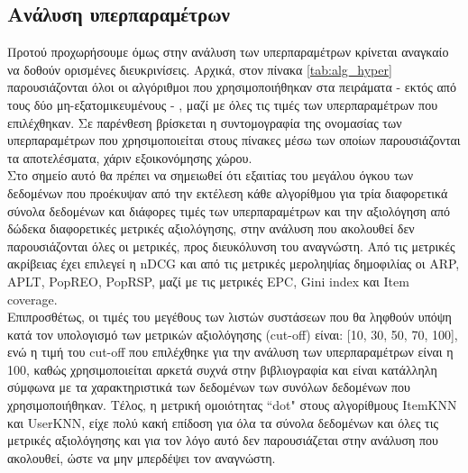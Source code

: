 \subsection{Ανάλυση υπερπαραμέτρων}
\noindent Προτού προχωρήσουμε όμως στην ανάλυση των υπερπαραμέτρων κρίνεται αναγκαίο να δοθούν ορισμένες διευκρινίσεις. Αρχικά, στον πίνακα \ref{tab:alg_hyper} παρουσιάζονται όλοι οι αλγόριθμοι που χρησιμοποιήθηκαν στα πειράματα - εκτός από τους δύο μη-εξατομικευμένους - , μαζί με όλες τις τιμές των υπερπαραμέτρων που επιλέχθηκαν. Σε παρένθεση βρίσκεται η συντομογραφία της ονομασίας των υπερπαραμέτρων που χρησιμοποιείται στους πίνακες μέσω των οποίων παρουσιάζονται τα αποτελέσματα, χάριν εξοικονόμησης χώρου.\\ Στο σημείο αυτό θα πρέπει να σημειωθεί ότι εξαιτίας του μεγάλου όγκου των δεδομένων που προέκυψαν από την εκτέλεση κάθε αλγορίθμου για τρία διαφορετικά σύνολα δεδομένων και διάφορες τιμές των υπερπαραμέτρων και την αξιολόγηση από δώδεκα διαφορετικές μετρικές αξιολόγησης, στην ανάλυση που ακολουθεί δεν παρουσιάζονται όλες οι μετρικές, προς διευκόλυνση του αναγνώστη. Από τις μετρικές ακρίβειας έχει επιλεγεί η nDCG και από τις μετρικές μεροληψίας δημοφιλίας οι ARP, APLT, PopREO, PopRSP, μαζί με τις μετρικές EPC, Gini index και Item coverage.\\ Επιπροσθέτως, οι τιμές του μεγέθους των λιστών συστάσεων που θα ληφθούν υπόψη κατά τον υπολογισμό των μετρικών αξιολόγησης (cut-off) είναι: [10, 30, 50, 70, 100], ενώ η τιμή του cut-off που επιλέχθηκε για την ανάλυση των υπερπαραμέτρων είναι η 100, καθώς χρησιμοποιείται αρκετά συχνά στην βιβλιογραφία και είναι κατάλληλη σύμφωνα με τα χαρακτηριστικά των δεδομένων των συνόλων δεδομένων που χρησιμοποιήθηκαν. Τέλος, η μετρική ομοιότητας ``dot" στους αλγορίθμους ItemKNN και UserKNN, είχε πολύ κακή επίδοση για όλα τα σύνολα δεδομένων και όλες τις μετρικές αξιολόγησης και για τον λόγο αυτό δεν παρουσιάζεται στην ανάλυση που ακολουθεί, ώστε να μην μπερδέψει τον αναγνώστη.
\newpage
